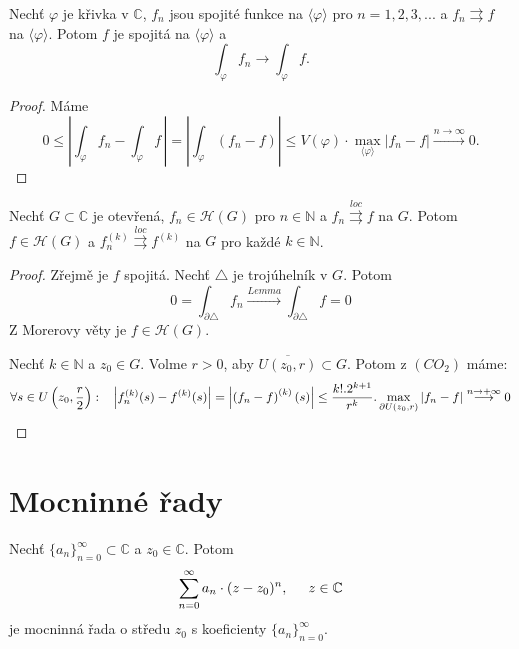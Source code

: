 \begin{lemma}
Nechť $\varphi$ je křivka v $\mathbb{C}$, $f_n$ jsou spojité funkce na $\langle\varphi\rangle$ pro $n=1,2,3,...$ a $f_n\rightrightarrows{f}$ na $\langle\varphi\rangle$. Potom $f$ je spojitá na $\langle\varphi\rangle$ a 
\[\int_\varphi{f_n}\longrightarrow\int_\varphi{f}.\]
\end{lemma}

\begin{proof}
Máme
\[0\leq\left\lvert{\int_\varphi{f_n}-\int_\varphi{f}}\, \right\lvert=
\left\lvert{\int_\varphi{(f_n-f)}}\right\lvert\leq{}
V(\varphi)\cdot\max_{\langle\varphi\rangle}{|f_n-f|}\overset{n\to\infty}{\longrightarrow}0.\]
\end{proof}

\begin{theorem}[Weierstrass]
Nechť $G\subset{\mathbb{C}}$ je otevřená, $f_n\in\mathcal{H}(G)$ pro $n\in\mathbb{N}$ a $f_n\overset{loc}{\rightrightarrows}f$ na $G$. Potom $f\in\mathcal{H}(G)$ a $f_n^{(k)}\overset{loc}{\rightrightarrows}f^{(k)}$ na $G$ pro každé $k\in\mathbb{N}$.
\end{theorem}

\begin{proof}
 Zřejmě je $f$ spojitá. Nechť $\triangle$ je trojúhelník v $G$. Potom 
\[0=\int_{\partial\triangle}{f_n}\overset{Lemma}{\longrightarrow}
\int_{\partial\triangle}{f}=0\]
Z Morerovy věty je $f\in\mathcal{H}(G)$.

 Nechť $k\in\mathbb{N}$ a $z_0\in{G}$. Volme $r>0$, aby $\overline{U(z_0,r)}\subset{G}$. Potom z $(CO_2)$ máme:
\[\forall{s\in{U\left(z_0,\frac{r}{2}\right)}}:\hspace{3mm}
{\left\lvert{f_n^{(k)}(s)-f^{(k)}(s)}\right\lvert}=
\left\lvert{\left({f_n-f}\right)^{(k)}(s)}\right\lvert\leq
\frac{k!.2^{k+1}}{r^k}.\max_{\partial{U(z_0,r)}}{|f_n-f|}
\overset{n\to+\infty}{\longrightarrow}0\]
\end{proof}

\section{\texorpdfstring{Mocninné řady}{Mocninné rady}}

\begin{definition}
Nechť $\{a_n\}_{n=0}^\infty\subset\mathbb{C}$ a $z_0\in\mathbb{C}$. Potom 
\begin{equation}
\sum_{n=0}^\infty{a_n\cdot(z-z_0)^n}, \hspace{5mm} z\in\mathbb{C}
\label{eqn:rada}
\end{equation}
je mocninná řada o středu $z_0$ s koeficienty $\{a_n\}_{n=0}^\infty$.
\end{definition}

